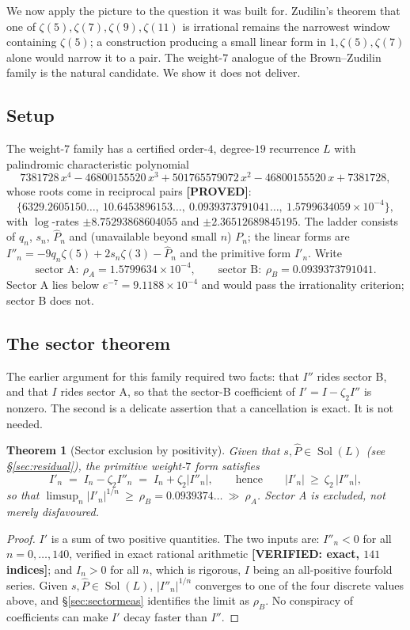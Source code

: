 \documentclass[11pt,reqno]{amsart}
\theoremstyle{plain}
\newtheorem{theorem}{Theorem}[section]
\theoremstyle{definition}
\theoremstyle{remark}
\newcommand{\PROVED}{{\normalfont\sffamily\bfseries[PROVED]}}
\newcommand{\VER}[1]{{\normalfont\sffamily\bfseries[VERIFIED: #1]}}
\DeclareMathOperator{\Sol}{Sol}
\newcommand{\Phat}{\widehat{P}}
\begin{document}
We now apply the picture to the question it was built for. Zudilin's theorem that one of
$\zeta(5),\zeta(7),\zeta(9),\zeta(11)$ is irrational \cite{Zu02a,Zu04} remains the narrowest
window containing $\zeta(5)$; a construction producing a small linear form in $1,\zeta(5),\zeta(7)$
alone would narrow it to a pair. The weight-$7$ analogue of the Brown--Zudilin family is the
natural candidate. We show it does not deliver.

\subsection{Setup}
The weight-$7$ family has a certified order-$4$, degree-$19$ recurrence $L$ with palindromic
characteristic polynomial
\[
  7381728\,x^4-46800155520\,x^3+501765579072\,x^2-46800155520\,x+7381728,
\]
whose roots come in reciprocal pairs \PROVED:
\[
  \{6329.2605150\ldots,\ 10.6453896153\ldots,\ 0.0939373791041\ldots,\ 1.5799634059\times10^{-4}\},
\]
with $\log$-rates $\pm8.75293868604055$ and $\pm2.36512689845195$. The ladder consists of
$q_n$, $s_n$, $\Phat_n$ and (unavailable beyond small $n$) $P_n$; the linear forms are
$I''_n=-9q_n\zeta(5)+2s_n\zeta(3)-\Phat_n$ and the primitive form $I'_n$. Write
\[
  \text{sector A}:\ \rho_A=1.5799634\times10^{-4},\qquad
  \text{sector B}:\ \rho_B=0.0939373791041 .
\]
Sector A lies below $e^{-7}=9.1188\times10^{-4}$ and would pass the irrationality criterion;
sector B does not.

\subsection{The sector theorem}
The earlier argument for this family required two facts: that $I''$ rides sector B, and that $I$
rides sector A, so that the sector-B coefficient of $I'=I-\zeta_2 I''$ is nonzero. The second is
a delicate assertion that a cancellation is exact. It is not needed.

\begin{theorem}[Sector exclusion by positivity]\label{thm:sector}
Given that $s,\Phat\in\Sol(L)$ (see \S\ref{sec:residual}), the primitive weight-$7$ form
satisfies
\[
  I'_n \;=\; I_n-\zeta_2 I''_n \;=\; I_n+\zeta_2|I''_n|,\qquad\text{hence}\qquad
  |I'_n|\ \ge\ \zeta_2\,|I''_n| ,
\]
so that $\limsup_n|I'_n|^{1/n}\ \ge\ \rho_B=0.0939374\ldots\ \gg\ \rho_A$. Sector A is
\emph{excluded}, not merely disfavoured.
\end{theorem}

\begin{proof}
$I'$ is a sum of two positive quantities. The two inputs are:
$I''_n<0$ for all $n=0,\dots,140$, verified in exact rational arithmetic \VER{exact, $141$
indices}; and $I_n>0$ for all $n$, which is rigorous, $I$ being an all-positive fourfold series.
Given $s,\Phat\in\Sol(L)$, $|I''_n|^{1/n}$ converges to one of the four discrete values above,
and \S\ref{sec:sectormeas} identifies the limit as $\rho_B$. No conspiracy of coefficients can
make $I'$ decay faster than $I''$.
\end{proof}
\end{document}
